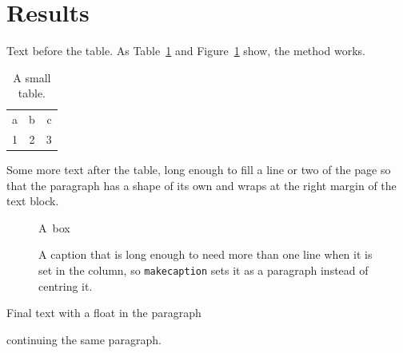 \documentclass{article}
\begin{document}
\section{Results}\label{sec}
Text before the table. As Table~\ref{tab} and Figure~\ref{fig} show, the method works.

\begin{table}[h]
\centering
\begin{tabular}{lcr}
\hline
a & b & c \\
1 & 2 & 3 \\
\hline
\end{tabular}
\caption{A small table.}\label{tab}
\end{table}

Some more text after the table, long enough to fill a line or two of the page so that
the paragraph has a shape of its own and wraps at the right margin of the text block.

\begin{figure}[t]
\centering
\mbox{A box}
\caption{A caption that is long enough to need more than one line when it is set in the
column, so \texttt{makecaption} sets it as a paragraph instead of centring it.}\label{fig}
\end{figure}

Final text with a float in the paragraph
\begin{table}[b]\caption{Bottom.}\end{table}
continuing the same paragraph.
\end{document}
